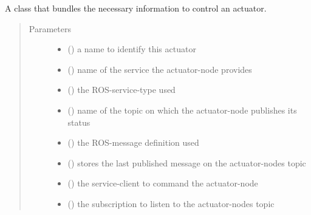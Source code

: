 \documentclass[a4paper,12pt,twoside]{article}
\begin{document}
\begin{fulllineitems}
\label{\detokenize{osbk_operation:osbk_operation.actuator_state_machine.ActuatorEntry}}
A class that bundles the necessary information to control an actuator.
\begin{quote}\begin{description}
\item[{Parameters}] \leavevmode\begin{itemize}
\item {} 
 () \textendash{} a name to identify this actuator

\item {} 
 () \textendash{} name of the service the actuator-node provides

\item {} 
 () \textendash{} the ROS-service-type used

\item {} 
 () \textendash{} name of the topic on which the actuator-node publishes its status

\item {} 
 () \textendash{} the ROS-message definition used

\item {} 
 () \textendash{} stores the last published message on the actuator-nodes topic

\item {} 
 () \textendash{} the service-client to command the actuator-node

\item {} 
 () \textendash{} the subscription to listen to the actuator-nodes topic

\end{itemize}

\end{description}\end{quote}

\end{fulllineitems}
\end{document}

